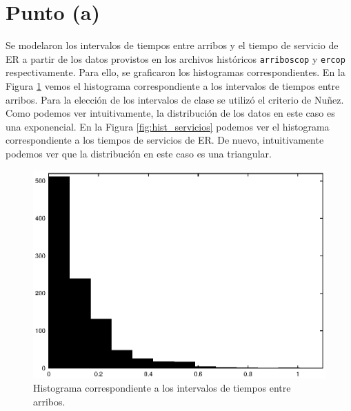 \documentclass[a4paper,10pt]{article}
\begin{document}


\section{Punto (a)}
Se modelaron los intervalos de tiempos entre arribos y el tiempo de servicio de ER a partir de los datos provistos en los archivos históricos \verb|arriboscop| y \verb|ercop| respectivamente. Para ello, se graficaron los histogramas correspondientes. En la Figura \ref{fig:hist_arriboscop} vemos el histograma correspondiente a los intervalos de tiempos entre arribos. Para la elección de los intervalos de clase se utilizó el criterio de Nuñez. Como podemos ver intuitivamente, la distribución de los datos en este caso es una exponencial. En la Figura \ref{fig:hist_servicios} podemos ver el histograma correspondiente a los tiempos de servicios de ER. De nuevo, intuitivamente podemos ver que la distribución en este caso es una triangular.

\begin{figure}[ht]
\begin{center}
\includegraphics[width=12cm]{../src/parteA/hist_arribos.eps}
\caption{\label{fig:hist_arriboscop} Histograma correspondiente a los intervalos de tiempos entre arribos.}
\end{center}
\end{figure}
\end{document}
